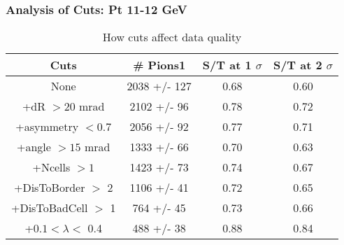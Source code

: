 \frame
{
\frametitle{Analysis of Cuts: Pt 11-12 GeV}
\begin{table}
\caption{How cuts affect data quality}
\centering
\begin{tabular}{c c c c}
\hline\hline
Cuts & \# Pions1 & S/T at 1 $\sigma$ & S/T at 2 $\sigma$ \\ [0.5ex]
\hline
None & 2038 +/-  127 & 0.68 & 0.60 \\ %
+dR $> 20$ mrad & 2102 +/-   96 & 0.78 & 0.72 \\ %
+asymmetry $< 0.7$ & 2056 +/-   92 & 0.77 & 0.71 \\ %
+angle $> 15$ mrad & 1333 +/-   66 & 0.70 & 0.63 \\ %
+Ncells $> 1$& 1423 +/-   73 & 0.74 & 0.67 \\ %
+DisToBorder $>$ 2 & 1106 +/-   41 & 0.72 & 0.65 \\ %
+DisToBadCell $>$ 1&  764 +/-   45 & 0.73 & 0.66 \\ %
+$0.1 < \lambda <$ 0.4 &  488 +/-   38 & 0.88 & 0.84 \\ %
[1ex]
\hline
\end{tabular}
\label{table:nonlin}
\end{table}
}

